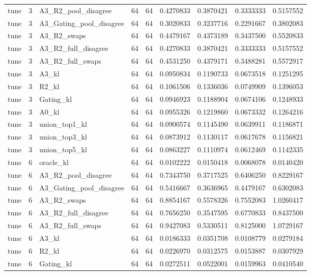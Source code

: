 \begin{tabular}{lrlrrrrrr}
tune & 3 & A3_R2_pool_disagree & 64 & 64 & 0.4270833 & 0.3870421 & 0.3333333 & 0.5157552 \\
tune & 3 & A3_Gating_pool_disagree & 64 & 64 & 0.3020833 & 0.3237716 & 0.2291667 & 0.3802083 \\
tune & 3 & A3_R2_swaps & 64 & 64 & 0.4479167 & 0.4373189 & 0.3437500 & 0.5520833 \\
tune & 3 & A3_R2_full_disagree & 64 & 64 & 0.4270833 & 0.3870421 & 0.3333333 & 0.5157552 \\
tune & 3 & A3_R2_full_swaps & 64 & 64 & 0.4531250 & 0.4379171 & 0.3488281 & 0.5572917 \\
tune & 3 & A3_kl & 64 & 64 & 0.0950834 & 0.1190733 & 0.0673518 & 0.1251295 \\
tune & 3 & R2_kl & 64 & 64 & 0.1061506 & 0.1336036 & 0.0749909 & 0.1396053 \\
tune & 3 & Gating_kl & 64 & 64 & 0.0946923 & 0.1188904 & 0.0674106 & 0.1248933 \\
tune & 3 & A0_kl & 64 & 64 & 0.0955326 & 0.1219860 & 0.0673332 & 0.1264216 \\
tune & 3 & union_top1_kl & 64 & 64 & 0.0900574 & 0.1145490 & 0.0639911 & 0.1186871 \\
tune & 3 & union_top3_kl & 64 & 64 & 0.0873912 & 0.1130117 & 0.0617678 & 0.1156821 \\
tune & 3 & union_top5_kl & 64 & 64 & 0.0863227 & 0.1110974 & 0.0612469 & 0.1142335 \\
tune & 6 & oracle_kl & 64 & 64 & 0.0102222 & 0.0150418 & 0.0068078 & 0.0140420 \\
tune & 6 & A3_R2_pool_disagree & 64 & 64 & 0.7343750 & 0.3717525 & 0.6406250 & 0.8229167 \\
tune & 6 & A3_Gating_pool_disagree & 64 & 64 & 0.5416667 & 0.3636965 & 0.4479167 & 0.6302083 \\
tune & 6 & A3_R2_swaps & 64 & 64 & 0.8854167 & 0.5578326 & 0.7552083 & 1.0260417 \\
tune & 6 & A3_R2_full_disagree & 64 & 64 & 0.7656250 & 0.3547595 & 0.6770833 & 0.8437500 \\
tune & 6 & A3_R2_full_swaps & 64 & 64 & 0.9427083 & 0.5330511 & 0.8125000 & 1.0729167 \\
tune & 6 & A3_kl & 64 & 64 & 0.0186333 & 0.0351708 & 0.0108779 & 0.0279184 \\
tune & 6 & R2_kl & 64 & 64 & 0.0226970 & 0.0312575 & 0.0153887 & 0.0307929 \\
tune & 6 & Gating_kl & 64 & 64 & 0.0272511 & 0.0522001 & 0.0159963 & 0.0410540 \\

\end{tabular}
